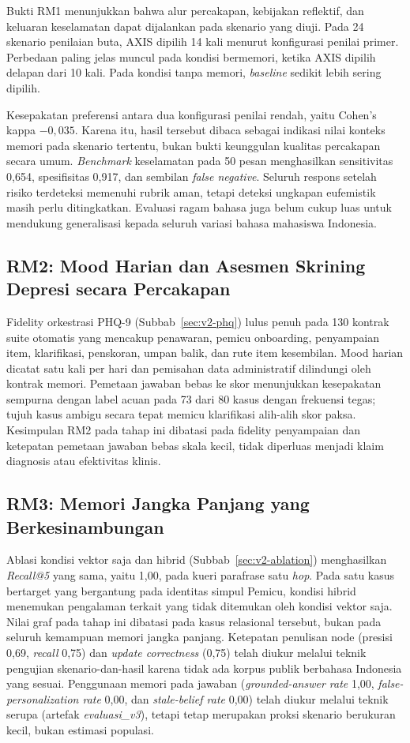 Bukti RM1 menunjukkan bahwa alur percakapan, kebijakan reflektif, dan keluaran keselamatan dapat dijalankan pada skenario yang diuji. Pada 24 skenario penilaian buta, AXIS dipilih 14 kali menurut konfigurasi penilai primer. Perbedaan paling jelas muncul pada kondisi bermemori, ketika AXIS dipilih delapan dari 10 kali. Pada kondisi tanpa memori, \textit{baseline} sedikit lebih sering dipilih.

Kesepakatan preferensi antara dua konfigurasi penilai rendah, yaitu Cohen's kappa $-0,035$. Karena itu, hasil tersebut dibaca sebagai indikasi nilai konteks memori pada skenario tertentu, bukan bukti keunggulan kualitas percakapan secara umum. \textit{Benchmark} keselamatan pada 50 pesan menghasilkan sensitivitas 0,654, spesifisitas 0,917, dan sembilan \textit{false negative}. Seluruh respons setelah risiko terdeteksi memenuhi rubrik aman, tetapi deteksi ungkapan eufemistik masih perlu ditingkatkan. Evaluasi ragam bahasa juga belum cukup luas untuk mendukung generalisasi kepada seluruh variasi bahasa mahasiswa Indonesia.

\subsection{RM2: Mood Harian dan Asesmen Skrining Depresi secara Percakapan}

Fidelity orkestrasi PHQ-9 (Subbab~\ref{sec:v2-phq}) lulus penuh pada 130 kontrak suite otomatis yang mencakup penawaran, pemicu onboarding, penyampaian item, klarifikasi, penskoran, umpan balik, dan rute item kesembilan. Mood harian dicatat satu kali per hari dan pemisahan data administratif dilindungi oleh kontrak memori. Pemetaan jawaban bebas ke skor menunjukkan kesepakatan sempurna dengan label acuan pada 73 dari 80 kasus dengan frekuensi tegas; tujuh kasus ambigu secara tepat memicu klarifikasi alih-alih skor paksa. Kesimpulan RM2 pada tahap ini dibatasi pada fidelity penyampaian dan ketepatan pemetaan jawaban bebas skala kecil, tidak diperluas menjadi klaim diagnosis atau efektivitas klinis.

\subsection{RM3: Memori Jangka Panjang yang Berkesinambungan}

Ablasi kondisi vektor saja dan hibrid (Subbab~\ref{sec:v2-ablation}) menghasilkan \textit{Recall@5} yang sama, yaitu 1,00, pada kueri parafrase satu \textit{hop}. Pada satu kasus bertarget yang bergantung pada identitas simpul Pemicu, kondisi hibrid menemukan pengalaman terkait yang tidak ditemukan oleh kondisi vektor saja. Nilai graf pada tahap ini dibatasi pada kasus relasional tersebut, bukan pada seluruh kemampuan memori jangka panjang. Ketepatan penulisan node (presisi 0,69, \textit{recall} 0,75) dan \textit{update correctness} (0,75) telah diukur melalui teknik pengujian skenario-dan-hasil karena tidak ada korpus publik berbahasa Indonesia yang sesuai. Penggunaan memori pada jawaban (\textit{grounded-answer rate} 1,00, \textit{false-personalization rate} 0,00, dan \textit{stale-belief rate} 0,00) telah diukur melalui teknik serupa (artefak \textit{evaluasi\_v3}), tetapi tetap merupakan proksi skenario berukuran kecil, bukan estimasi populasi.
